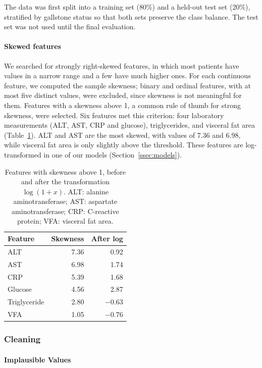 \documentclass[conference]{IEEEtran}
\begin{document}
The data was first split into a training set (80\%) and a held-out test set
(20\%), stratified by gallstone status so that both sets preserve the class
balance. The test set was not used until the final evaluation.

\paragraph{Skewed features}

We searched for strongly right-skewed features, in which most patients have
values in a narrow range and a few have much higher ones. For each continuous
feature, we computed the sample skewness; binary and ordinal features, with at
most five distinct values, were excluded, since skewness is not meaningful for
them. Features with a skewness above 1, a common rule of thumb for strong
skewness, were selected. Six features met this criterion: four laboratory
measurements (ALT, AST, CRP and glucose), triglycerides, and visceral fat area
(Table~\ref{tab:skewness}). ALT and AST are the most skewed, with values of
7.36 and 6.98, while visceral fat area is only slightly above the threshold.
These features are log-transformed in one of our models
(Section~\ref{ssec:models}).

\begin{table}[h]
\centering
\caption{Features with skewness above 1, before and after the transformation
$\log(1 + x)$. ALT: alanine aminotransferase; AST: aspartate
aminotransferase; CRP: C-reactive protein; VFA: visceral fat area.}
\label{tab:skewness}
\begin{tabular}{lrr}
\hline
Feature & Skewness & After log \\
\hline
ALT          & 7.36 & 0.92 \\
AST          & 6.98 & 1.74 \\
CRP          & 5.39 & 1.68 \\
Glucose      & 4.56 & 2.87 \\
Triglyceride & 2.80 & $-0.63$ \\
VFA          & 1.05 & $-0.76$ \\
\hline
\end{tabular}
\end{table}

\subsubsection{Cleaning}
\label{ssec:cleaning}

\paragraph{Implausible Values}
\end{document}

